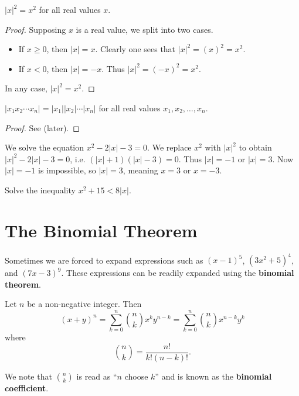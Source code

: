 \begin{proposition}
    $|x|^2 = x^2$ for all real values $x$.
\end{proposition}
\begin{proof}
    Supposing $x$ is a real value, we split into two cases.
    \begin{itemize}
        \item If $x \geq 0$, then $|x| = x$. Clearly one sees that $|x|^2 = (x)^2 = x^2$.
        \item If $x < 0$, then $|x| = -x$. Thus $|x|^2 = (-x)^2 = x^2$.
    \end{itemize}
    In any case, $|x|^2 = x^2$.
\end{proof}

\begin{proposition}
    $|x_1x_2\cdots x_n| = |x_1||x_2|\cdots|x_n|$ for all real values $x_1, x_2, \dots, x_n$.
\end{proposition}
\begin{proof}
    See  (later).
\end{proof}

\begin{example}
    We solve the equation $x^2 - 2|x| - 3 = 0$. We replace $x^2$ with $|x|^2$ to obtain $|x|^2 - 2|x| - 3 = 0$, i.e. $(|x|+1)(|x|-3) = 0$. Thus $|x| = -1$ or $|x| = 3$. Now $|x| = -1$ is impossible, so $|x| = 3$, meaning $x = 3$ or $x = -3$.
\end{example}

\begin{exercise}
    Solve the inequality $x^2 + 15 < 8|x|$.
\end{exercise}

\section{The Binomial Theorem}
Sometimes we are forced to expand expressions such as $(x-1)^5$, $(3x^2 + 5)^4$, and $(7x - 3)^9$. These expressions can be readily expanded using the \textbf{binomial theorem}.
\begin{theorem}\label{thrm-binomial}
    Let $n$ be a non-negative integer. Then
    \[
        (x+y)^n = \sum_{k=0}^n {n \choose k}x^ky^{n-k} = \sum_{k=0}^n {n \choose k}x^{n-k}y^k
    \]
    where
    \[
        {n \choose k} = \frac{n!}{k!(n-k)!}.
    \]
\end{theorem}
We note that ${n \choose k}$ is read as ``$n$ choose $k$'' and is known as the \textbf{binomial coefficient}.


